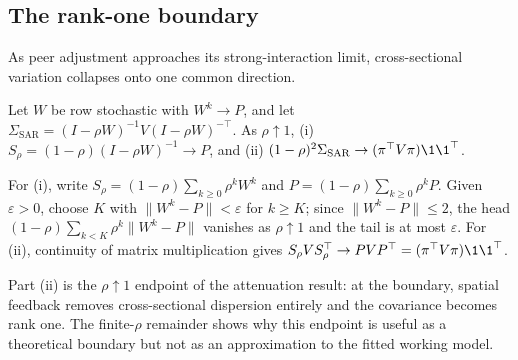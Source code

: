 \subsection{The rank-one boundary}

As peer adjustment approaches its strong-interaction limit, cross-sectional
variation collapses onto one common direction.

\begin{theorem}
  \label{thm:resolvent-from-perron}\label{thm:rankone-collapse}
  Let $W$ be row stochastic with $W^k\to P$, and let
  $\Sigma_{\mathrm{SAR}}=(I-\rho W)^{-1}V(I-\rho W)^{-\top}$.
  As $\rho\uparrow1$, (i) $S_\rho=(1-\rho)(I-\rho W)^{-1}\to P$, and
  (ii) $(1-\rho)^2\Sigma_{\mathrm{SAR}}\to(\pi^\top V\pi)\1\1^\top$.
\end{theorem}
For (i), write $S_\rho=(1-\rho)\sum_{k\geq0}\rho^{k}W^{k}$ and
$P=(1-\rho)\sum_{k\geq0}\rho^{k}P$.
Given $\varepsilon>0$, choose $K$ with $\lVert W^k-P\rVert<\varepsilon$ for
$k\geq K$; since $\lVert W^k-P\rVert\leq2$, the head
$(1-\rho)\sum_{k<K}\rho^k\lVert W^k-P\rVert$ vanishes as $\rho\uparrow1$ and
the tail is at most $\varepsilon$.
For (ii), continuity of matrix multiplication gives
$S_\rho VS_\rho^\top\to PVP^\top=(\pi^\top V\pi)\1\1^\top$.

Part (ii) is the $\rho\uparrow1$ endpoint of the attenuation result: at the
boundary, spatial feedback removes cross-sectional dispersion entirely and the
covariance becomes rank one.
The finite-$\rho$ remainder shows why this endpoint is useful as a theoretical
boundary but not as an approximation to the fitted working model.
